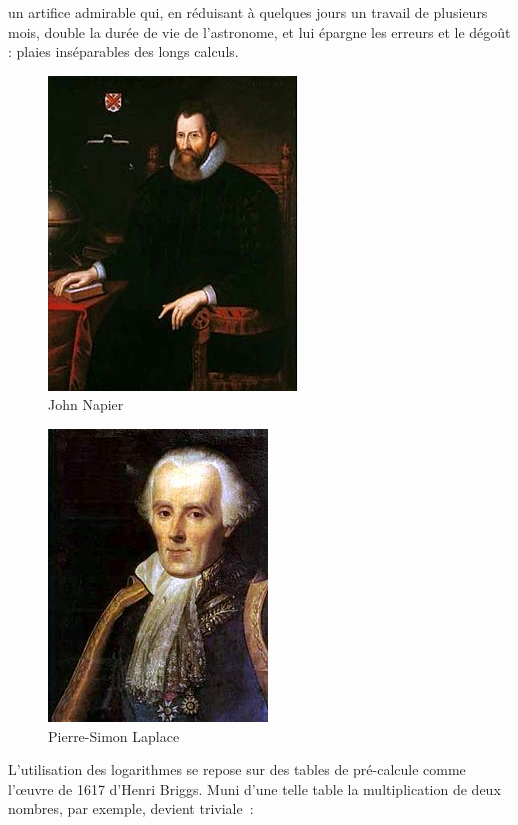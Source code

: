 \begin{coolquote} un artifice admirable qui, en réduisant à quelques jours un travail de plusieurs mois, double la durée de vie de l'astronome, et lui épargne les erreurs et le dégoût : plaies inséparables des longs calculs.
\end{coolquote}

\begin{minipage}[H]{0.49\linewidth}
  \begin{figure}[H]
  \centering
  \includegraphics[height=0.15\paperheight]{../resources/illustrations/napier}
  \caption{John Napier}
  \end{figure}
\end{minipage}
\begin{minipage}[H]{0.49\linewidth}
  \begin{figure}[H]
  \centering
  \includegraphics[height=0.15\paperheight]{../resources/illustrations/laplace}
  \caption{Pierre-Simon Laplace}
  \end{figure}
\end{minipage}
L'utilisation des logarithmes se repose sur des tables de pré-calcule comme l'\oe{}uvre de 1617 d'Henri Briggs. Muni d'une telle table la multiplication de deux nombres, par exemple, devient triviale~:

